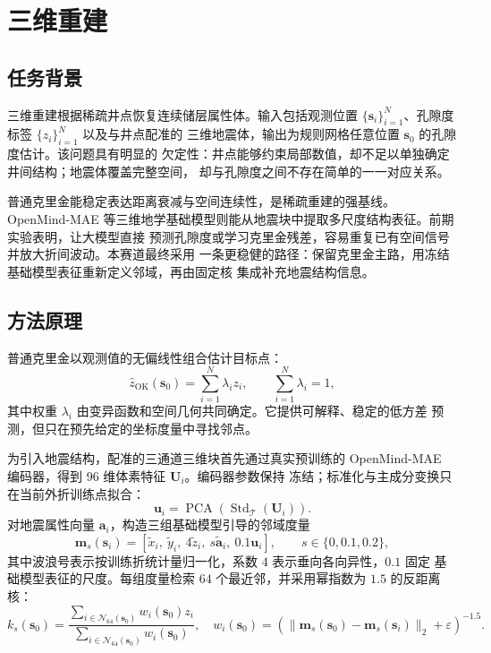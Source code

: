 \chapter{三维重建}

\section{任务背景}

三维重建根据稀疏井点恢复连续储层属性体。输入包括观测位置
$\{\bm{s}_i\}_{i=1}^{N}$、孔隙度标签 $\{z_i\}_{i=1}^{N}$ 以及与井点配准的
三维地震体，输出为规则网格任意位置 $\bm{s}_0$ 的孔隙度估计。该问题具有明显的
欠定性：井点能够约束局部数值，却不足以单独确定井间结构；地震体覆盖完整空间，
却与孔隙度之间不存在简单的一一对应关系。

普通克里金能稳定表达距离衰减与空间连续性，是稀疏重建的强基线。OpenMind-MAE
等三维地学基础模型则能从地震块中提取多尺度结构表征。前期实验表明，让大模型直接
预测孔隙度或学习克里金残差，容易重复已有空间信号并放大折间波动。本赛道最终采用
一条更稳健的路径：保留克里金主路，用冻结基础模型表征重新定义邻域，再由固定核
集成补充地震结构信息。

\section{方法原理}

普通克里金以观测值的无偏线性组合估计目标点：
\begin{equation}
  \hat{z}_{\mathrm{OK}}(\bm{s}_0)
  =\sum_{i=1}^{N}\lambda_i z_i,
  \qquad \sum_{i=1}^{N}\lambda_i=1,
\end{equation}
其中权重 $\lambda_i$ 由变异函数和空间几何共同确定。它提供可解释、稳定的低方差
预测，但只在预先给定的坐标度量中寻找邻点。

为引入地震结构，配准的三通道三维块首先通过真实预训练的 OpenMind-MAE
编码器\cite{wald2025openmind}，得到 $96$ 维体素特征 $\bm{U}_i$。编码器参数保持
冻结；标准化与主成分变换只在当前外折训练点拟合：
\begin{equation}
  \bm{u}_i=\operatorname{PCA}\!\left(
  \operatorname{Std}_{\mathcal{T}}(\bm{U}_i)\right).
\end{equation}
对地震属性向量 $\bm{a}_i$，构造三组基础模型引导的邻域度量
\begin{equation}
  \bm{m}_{s}(\bm{s}_i)=
  \left[
    \tilde{x}_i,\ \tilde{y}_i,\ 4\tilde{z}_i,
    \ s\tilde{\bm{a}}_i,\ 0.1\bm{u}_i
  \right],
  \qquad s\in\{0,0.1,0.2\},
  \label{eq:reconstruction-metric}
\end{equation}
其中波浪号表示按训练折统计量归一化，系数 $4$ 表示垂向各向异性，$0.1$ 固定
基础模型表征的尺度。每组度量检索 $64$ 个最近邻，并采用幂指数为 $1.5$ 的反距离核：
\begin{equation}
  k_s(\bm{s}_0)=
  \frac{\sum_{i\in\mathcal{N}_{64}(\bm{s}_0)}
  w_i(\bm{s}_0)z_i}
  {\sum_{i\in\mathcal{N}_{64}(\bm{s}_0)}w_i(\bm{s}_0)},
  \quad
  w_i(\bm{s}_0)=
  \left(\lVert\bm{m}_s(\bm{s}_0)-\bm{m}_s(\bm{s}_i)\rVert_2
  +\varepsilon\right)^{-1.5}.
\end{equation}

